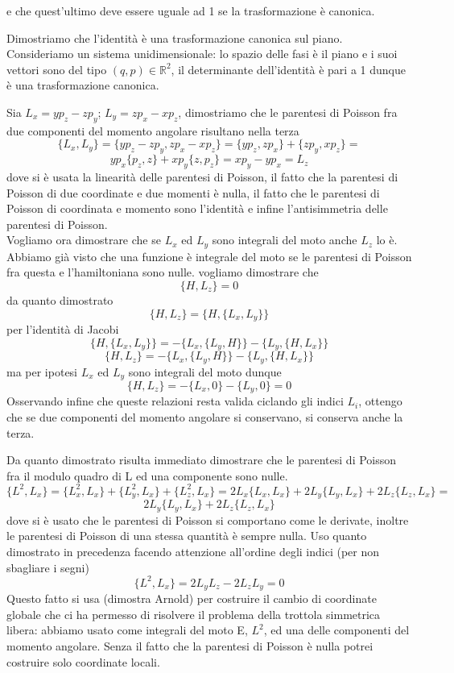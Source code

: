\documentclass[
10pt, %
a4paper, %
oneside, %
headinclude,footinclude, %
BCOR5mm, %
]{scrartcl}
\begin{document}
e che quest'ultimo deve essere uguale ad 1 se la trasformazione è canonica.
\begin{esempio}[L'identità]
	Dimostriamo che l'identità è una trasformazione canonica sul piano. Consideriamo un sistema unidimensionale: lo spazio delle fasi è il piano e i suoi vettori sono del tipo \((q, p)\in\mathbb{R}^2\), il determinante dell'identità è pari a 1 dunque è una trasformazione canonica.
\end{esempio}
\begin{esercizio}
	Sia \(L_x = yp_z-zp_y\); \(L_y=zp_x-xp_z\), dimostriamo che le parentesi di Poisson fra due componenti del momento angolare risultano nella terza
	\[\{L_x, L_y\} = \{yp_z-zp_y, zp_x-xp_z\} = \{yp_z, zp_x\}+\{zp_y, xp_z\} =\]
	\[ yp_x\{p_z, z\}+xp_y\{z, p_z\} = xp_y-yp_x = L_z\]
	dove si è usata la linearità delle parentesi di Poisson, il fatto che la parentesi di Poisson di due coordinate e due momenti è nulla, il fatto che le parentesi di Poisson di coordinata e momento sono l'identità e infine l'antisimmetria delle parentesi di Poisson.\\
	Vogliamo ora dimostrare che se \(L_x\) ed \(L_y\) sono integrali del moto anche \(L_z\) lo è. Abbiamo già visto che una funzione è integrale del moto se le parentesi di Poisson fra questa e l'hamiltoniana sono nulle. vogliamo dimostrare che
	\[\{H, L_z\} = 0 \]
	da quanto dimostrato
	\[\{ H, L_z\} = \{H, \{L_x, L_y\}\}\]
	 per l'identità di Jacobi
	\[\{H, \{L_x, L_y\}\} = -\{L_x, \{L_y, H\}\}-\{L_y, \{H, L_x\}\}\]
	\[\{ H, L_z\} = -\{L_x, \{L_y, H\}\}-\{L_y, \{H, L_x\}\}\]
	ma per ipotesi \(L_x\) ed \(L_y\) sono integrali del moto dunque 
	\[\{ H, L_z\} = -\{L_x, 0\}-\{L_y, 0\} = 0\]
	Osservando infine che queste relazioni resta valida ciclando gli indici \(L_i\), ottengo che se due componenti del momento angolare si conservano, si conserva anche la terza.
\end{esercizio}
\begin{esercizio}
	Da quanto dimostrato risulta immediato dimostrare che le parentesi di Poisson fra il modulo quadro di L ed una componente sono nulle. 
	\[\{L^2, L_x\} = \{L_x^2, L_x\}+\{L_y^2, L_x\}+\{L_z^2, L_x\} =  2L_x\{L_x, L_x\}+2L_y\{L_y, L_x\}+2L_z\{L_z, L_x\} =\]
	\[ 2L_y\{L_y, L_x\}+2L_z\{L_z, L_x\}\]
	dove si è usato che le parentesi di Poisson si comportano come le derivate, inoltre le parentesi di Poisson di una stessa quantità è sempre nulla. Uso quanto dimostrato in precedenza facendo attenzione all'ordine degli indici (per non sbagliare i segni)
	\[\{L^2, L_x\} = 2L_yL_z-2L_zL_y = 0\]
	Questo fatto si usa (dimostra Arnold) per costruire il cambio di coordinate globale che ci ha permesso di risolvere il problema della trottola simmetrica libera: abbiamo usato come integrali del moto E, \(L^2\), ed una delle componenti del momento angolare. Senza il fatto che la parentesi di Poisson è nulla potrei costruire solo coordinate locali.
\end{esercizio}
\end{document}
